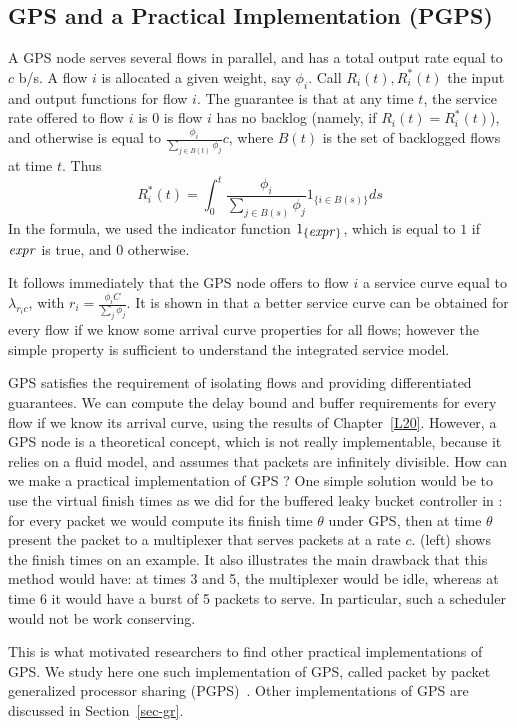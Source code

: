 \subsection{GPS and a Practical Implementation (PGPS)}

A GPS node serves several flows in parallel, and has a total
output rate equal to $c$ b/s. A flow $i$ is allocated a given
weight, say $\phi_i$. Call $R_i(t), R^*_i(t)$ the input and output
functions for flow $i$. The guarantee is that at any time $t$, the
service rate offered to flow $i$ is 0 is flow $i$ has no backlog
(namely, if $R_i(t)=R_i^*(t)$), and otherwise is equal to
$\frac{\phi_i}{\sum_{j \in B(t)} \phi_{j}}c$, where $B(t)$ is the
set of backlogged flows at time $t$. Thus
 $$R^*_i(t) = \int_0^t \frac{\phi_i}{\sum_{j \in B(s)} \phi_{j}} 1_{\{i \in B(s)\}}ds
 $$
 In the formula, we used the indicator function
 $1_{\{\mbox{\emph{expr}}\}}$, which is equal to $1$ if $\mbox{\emph{expr}}$ is
 true, and $0$ otherwise.

It follows immediately that the GPS node offers to flow $i$ a
service curve equal to $\lambda_{r_i c}$, with $r_i=\frac{\phi_i
C}{\sum_{j} \phi_{j}}$. It is shown in \cite{pg94} that a better
service curve can be obtained for every flow if we know some
arrival curve properties for all flows; however the simple
property is sufficient to understand the integrated service model.

GPS satisfies the requirement of isolating flows and providing
differentiated guarantees. We can compute the delay bound and
buffer requirements for every flow if we know its arrival curve,
using the results of Chapter~\ref{L20}. However, a GPS node is a
theoretical concept, which is not really implementable, because it
relies on a fluid model, and assumes that packets are infinitely
divisible. How can we make a practical implementation of GPS ? One
simple solution would be to use the virtual finish times as we did
for the buffered leaky bucket controller in : for
every packet we would compute its finish time $\theta$ under GPS,
then at time $\theta$ present the packet to a multiplexer that
serves packets at a rate $c$.  (left) shows the
finish times on an example. It also illustrates the main drawback
that this method would have: at times 3 and 5, the multiplexer
would be idle, whereas at time 6 it would have a burst of 5
packets to serve. In particular, such a scheduler would not be
work conserving.

This is what motivated researchers to find other practical
implementations of GPS. We study here one such implementation of
GPS, called
packet by packet generalized processor sharing (PGPS)~\cite{pg93}. %
%
Other implementations of GPS are discussed in
Section~\ref{sec-gr}.

